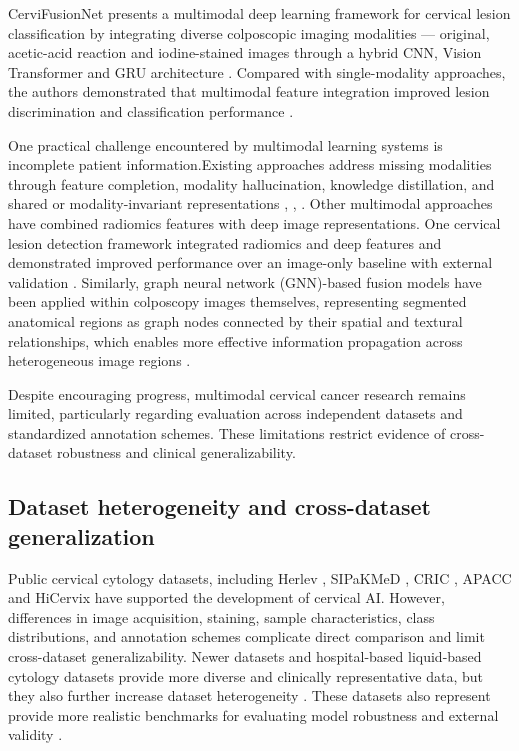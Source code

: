 \documentclass{article}
\begin{document}
CerviFusionNet presents a multimodal deep learning framework for cervical lesion classification by integrating diverse colposcopic imaging modalities — original, acetic-acid reaction and iodine-stained images through a hybrid CNN, Vision Transformer and GRU architecture \cite{sha2024cervifusionnet}. Compared with single-modality approaches, the authors demonstrated that multimodal feature integration improved lesion discrimination and classification performance \cite{sha2024cervifusionnet}. 

One practical challenge encountered by multimodal learning systems is incomplete patient information.Existing approaches address missing modalities through feature completion, modality hallucination, knowledge distillation, and shared or modality-invariant representations \cite{wu2026deep}, \cite{havaei2016hemis}, \cite{yao2024drfuse}. Other multimodal approaches have combined radiomics features with deep image representations. One cervical lesion detection framework integrated radiomics and deep features and demonstrated improved performance over an image-only baseline with external validation \cite{niu2025hybridfeatu}. Similarly, graph neural network (GNN)-based fusion models have been applied within colposcopy images themselves, representing segmented anatomical regions as graph nodes connected by their spatial and textural relationships, which enables more effective information propagation across heterogeneous image regions \cite{chatterjee2025multi}. 

Despite encouraging progress, multimodal cervical cancer research remains limited, particularly regarding evaluation across independent datasets and standardized annotation schemes. These limitations restrict evidence of cross-dataset robustness and clinical generalizability.

\subsection{Dataset heterogeneity and cross-dataset generalization}

Public cervical cytology datasets, including Herlev \cite{jantzen2005herlev}, SIPaKMeD \cite{plissiti2018sipakmed}, CRIC \cite{rezende2021cric}, APACC \cite{kupas2024apacc} and HiCervix \cite{cai2024hicervix} have supported the development of cervical AI. However, differences in image acquisition, staining, sample characteristics, class distributions, and annotation schemes complicate direct comparison and limit cross-dataset generalizability. Newer datasets and hospital-based liquid-based cytology datasets provide more diverse and clinically representative data, but they also further increase dataset heterogeneity \cite{hussain2020liquidbased}. These datasets also represent provide more realistic benchmarks for evaluating model robustness and external validity \cite{hussain2020liquidbased}.
\end{document}

